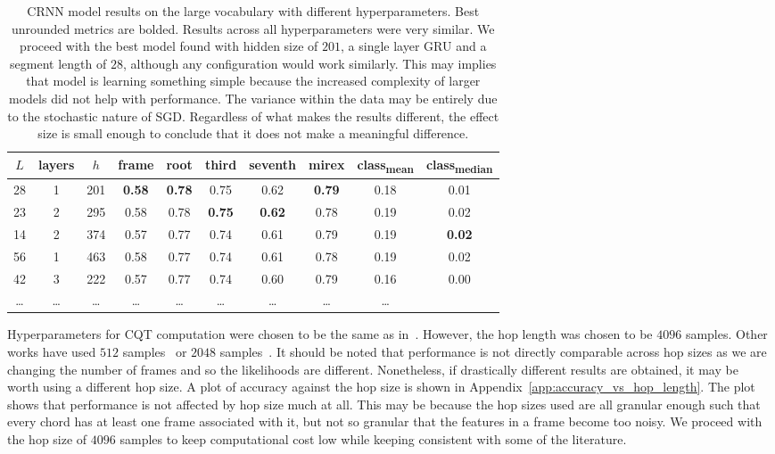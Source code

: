 \begin{table}[H]
    \centering
    \begin{tabular}{cccccccccc}
        \toprule
        $L$ & layers & $h$ & frame & root & third & seventh & mirex & class\textsubscript{mean} & class\textsubscript{median} \\
        \midrule
        28 & 1 & 201 & \textbf{0.58} & \textbf{0.78} & 0.75 & 0.62 & \textbf{0.79} & 0.18 & 0.01 \\
        23 & 2 & 295 & 0.58 & 0.78 & \textbf{0.75} & \textbf{0.62} & 0.78 & 0.19 & 0.02 \\
        14 & 2 & 374 & 0.57 & 0.77 & 0.74 & 0.61 & 0.79 & 0.19 & \textbf{0.02} \\
        56 & 1 & 463 & 0.58 & 0.77 & 0.74 & 0.61 & 0.78 & 0.19 & 0.02 \\
        42 & 3 & 222 & 0.57 & 0.77 & 0.74 & 0.60 & 0.79 & 0.16 & 0.00 \\
        \ldots & \ldots & \ldots & \ldots & \ldots & \ldots & \ldots & \ldots & \ldots \\
        \bottomrule
    \end{tabular}
    \caption{CRNN model results on the large vocabulary with different hyperparameters. Best unrounded metrics are bolded. Results across all hyperparameters were very similar. We proceed with the best model found with hidden size of $201$, a single layer GRU and a segment length of $28$, although any configuration would work similarly. This may implies that model is learning something simple because the increased complexity of larger models did not help with performance. The variance within the data may be entirely due to the stochastic nature of SGD. Regardless of what makes the results different, the effect size is small enough to conclude that it does not make a meaningful difference.}\label{tab:crnn_hparams}
\end{table}

Hyperparameters for CQT computation were chosen to be the same as in~\citet{StructuredTraining}. However, the hop length was chosen to be $4096$ samples. Other works have used $512$ samples~\citet{ACRLargeVocab1} or $2048$ samples~\citet{CurriculumLearning}. It should be noted that performance is not directly comparable across hop sizes as we are changing the number of frames and so the likelihoods are different. Nonetheless, if drastically different results are obtained, it may be worth using a different hop size. A plot of accuracy against the hop size is shown in Appendix~\ref{app:accuracy_vs_hop_length}. The plot shows that performance is not affected by hop size much at all. This may be because the hop sizes used are all granular enough such that every chord has at least one frame associated with it, but not so granular that the features in a frame become too noisy. We proceed with the hop size of $4096$ samples to keep computational cost low while keeping consistent with some of the literature.


